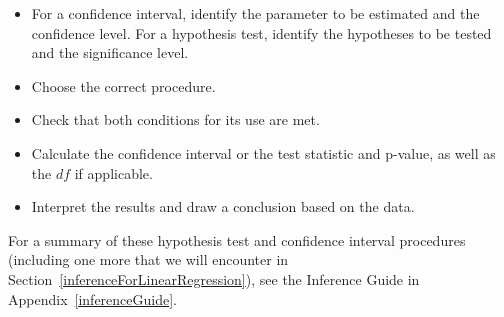 \begin{itemize}\vspace{-1mm}
\setlength{\itemsep}{0mm}
\item For a confidence interval, identify the parameter to be estimated and the confidence level.  For a hypothesis test, identify the hypotheses to be tested and the significance level.
\item Choose the correct procedure.
\item Check that both conditions for its use are met.
\item Calculate the confidence interval or the test statistic and p-value, as well as the $df$ if applicable.
\item Interpret the results and draw a conclusion based on the data.
\end{itemize}
For a summary of these hypothesis test and confidence interval procedures (including one more that we will encounter in Section~\ref{inferenceForLinearRegression}), see the Inference Guide in Appendix~\ref{inferenceGuide}.
